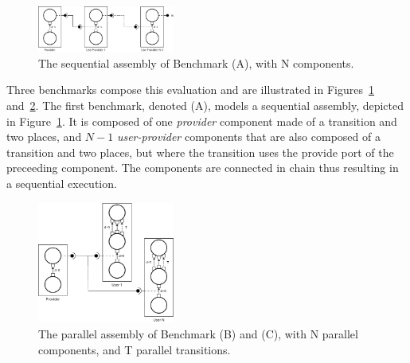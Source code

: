 
\begin{figure}[h]
  \begin{center}
    \includegraphics[width=0.4\textwidth]{./images/seq.pdf}
    \caption{The \mad sequential assembly of Benchmark (A), with N components.}
    \label{fig:seq}
  \end{center}
\end{figure}

Three benchmarks compose this evaluation and are illustrated in
Figures~\ref{fig:seq} and~\ref{fig:par}.
The first benchmark, denoted (A), models a sequential \mad assembly,
depicted in Figure~\ref{fig:seq}. It is composed of one
\emph{provider} component made of a transition and two places, and
$N-1$ \emph{user-provider} components that are also composed of a
transition and two places, but where the transition uses the provide
port of the preceeding component. The components are connected in
chain thus resulting in a sequential execution.

\begin{figure}[h]
  \begin{center}
    \includegraphics[width=0.4\textwidth]{./images/par.pdf}
    \caption{The \mad parallel assembly of Benchmark (B) and (C), with N parallel components, and T parallel transitions.}
    \label{fig:par}
  \end{center}
\end{figure}

